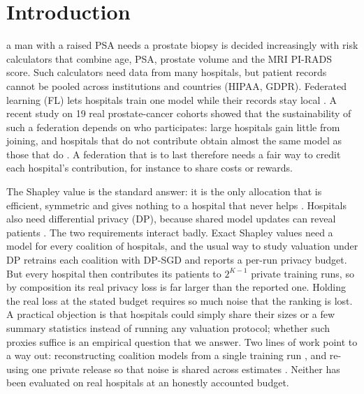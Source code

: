 \documentclass[journal]{IEEEtran}
\begin{document}
\section{Introduction}
 a man with a raised PSA needs a prostate biopsy is decided increasingly with risk calculators that combine age, PSA, prostate volume and the MRI PI-RADS score. Such calculators need data from many hospitals, but patient records cannot be pooled across institutions and countries (HIPAA, GDPR). Federated learning (FL) lets hospitals train one model while their records stay local \cite{Rieke2020DigitalHealth, McMahan2017FedAvg}. A recent study on 19 real prostate-cancer cohorts showed that the sustainability of such a federation depends on who participates: large hospitals gain little from joining, and hospitals that do not contribute obtain almost the same model as those that do \cite{Kazlouski2025HospitalParticipation}. A federation that is to last therefore needs a fair way to credit each hospital's contribution, for instance to share costs or rewards.

The Shapley value is the standard answer: it is the only allocation that is efficient, symmetric and gives nothing to a hospital that never helps \cite{Shapley1953, Ghorbani2019DataShapley}. Hospitals also need differential privacy (DP), because shared model updates can reveal patients \cite{Shokri2017MIA, Abadi2016DPSGD}. The two requirements interact badly. Exact Shapley values need a model for every coalition of hospitals, and the usual way to study valuation under DP retrains each coalition with DP-SGD and reports a per-run privacy budget. But every hospital then contributes its patients to $2^{K-1}$ private training runs, so by composition its real privacy loss is far larger than the reported one. Holding the real loss at the stated budget requires so much noise that the ranking is lost. A practical objection is that hospitals could simply share their sizes or a few summary statistics instead of running any valuation protocol; whether such proxies suffice is an empirical question that we answer. Two lines of work point to a way out: reconstructing coalition models from a single training run \cite{Song2019BlockchainFL, Wei2020DataValuation, Liu2022GTG}, and re-using one private release so that noise is shared across estimates \cite{Zhou2025Data}. Neither has been evaluated on real hospitals at an honestly accounted budget.
\end{document}
